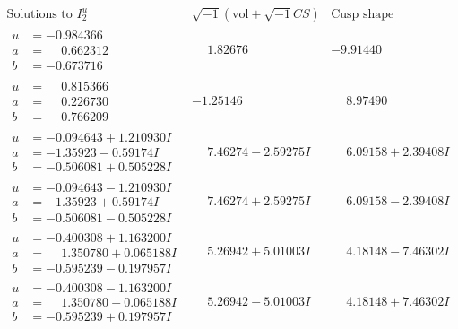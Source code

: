 \documentclass[1p]{elsarticle_modified}
\theoremstyle{definition}
\newcommand{\I}{\sqrt{-1}}
\begin{document}
$$\begin{array}{c|c|c}  
\text{Solutions to }I^u_{2}& \I (\text{vol} + \sqrt{-1}CS) & \text{Cusp shape}\\
 \hline 
\begin{aligned}
u &= -0.984366\phantom{ +0.000000I} \\
a &= \phantom{-}0.662312\phantom{ +0.000000I} \\
b &= -0.673716\phantom{ +0.000000I}\end{aligned}
 & \phantom{-}1.82676\phantom{ +0.000000I} & -9.91440\phantom{ +0.000000I} \\ \hline\begin{aligned}
u &= \phantom{-}0.815366\phantom{ +0.000000I} \\
a &= \phantom{-}0.226730\phantom{ +0.000000I} \\
b &= \phantom{-}0.766209\phantom{ +0.000000I}\end{aligned}
 & -1.25146\phantom{ +0.000000I} & \phantom{-}8.97490\phantom{ +0.000000I} \\ \hline\begin{aligned}
u &= -0.094643 + 1.210930 I \\
a &= -1.35923 - 0.59174 I \\
b &= -0.506081 + 0.505228 I\end{aligned}
 & \phantom{-}7.46274 - 2.59275 I & \phantom{-}6.09158 + 2.39408 I \\ \hline\begin{aligned}
u &= -0.094643 - 1.210930 I \\
a &= -1.35923 + 0.59174 I \\
b &= -0.506081 - 0.505228 I\end{aligned}
 & \phantom{-}7.46274 + 2.59275 I & \phantom{-}6.09158 - 2.39408 I \\ \hline\begin{aligned}
u &= -0.400308 + 1.163200 I \\
a &= \phantom{-}1.350780 + 0.065188 I \\
b &= -0.595239 - 0.197957 I\end{aligned}
 & \phantom{-}5.26942 + 5.01003 I & \phantom{-}4.18148 - 7.46302 I \\ \hline\begin{aligned}
u &= -0.400308 - 1.163200 I \\
a &= \phantom{-}1.350780 - 0.065188 I \\
b &= -0.595239 + 0.197957 I\end{aligned}
 & \phantom{-}5.26942 - 5.01003 I & \phantom{-}4.18148 + 7.46302 I \\ \hline\begin{aligned}

\end{aligned}
\end{array}$$
\end{document}
